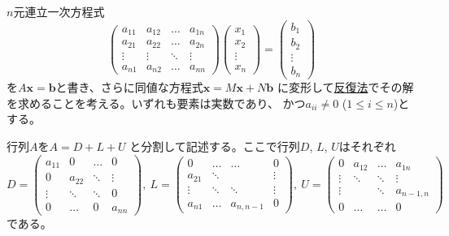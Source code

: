 
$n$元連立一次方程式
\begin{equation*}
  \begin{pmatrix}
    a_{11} & a_{12} & \ldots & a_{1n}\\
    a_{21} & a_{22} & \ldots & a_{2n}\\
    \vdots & \vdots & \ddots & \vdots \\
    a_{n1} & a_{n2} & \ldots & a_{nn}
  \end{pmatrix}
  \begin{pmatrix}
    x_{1} \\
    x_{2} \\
    \vdots\\
    x_{n}
  \end{pmatrix}
  =
  \begin{pmatrix}
    b_{1} \\
    b_{2} \\
    \vdots\\
    b_{n}
  \end{pmatrix}
\end{equation*}
を$A\mathbf{x} = \mathbf{b}$と書き、さらに同値な方程式$\mathbf{x} = M\mathbf{x}+N\mathbf{b}$
に変形して\underline{反復法}でその解を求めることを考える。いずれも要素は実数であり、
かつ$a_{ii}\neq 0$ ($1\le i\le n$)とする。

行列$A$を$A = D + L + U$ と分割して記述する。ここで行列$D$, $L$, $U$はそれぞれ
\begin{equation*}
  D = \begin{pmatrix}
        a_{11} &  0      & \ldots & 0\\
        0      & a_{22}  & \ddots & \vdots\\
        \vdots & \ddots  & \ddots & 0\\
        0      &  \ldots & 0      & a_{nn}
      \end{pmatrix},\ 
  L = \begin{pmatrix}
        0      & \ldots & \ldots & 0 \\
        a_{21} & \ddots &        & \vdots\\
        \vdots & \ddots & \ddots & \vdots \\
        a_{n1} & \ldots & a_{n,n-1} & 0
      \end{pmatrix},\ 
  U = \begin{pmatrix}
        0      & a_{12} & \ldots & a_{1n} \\
        \vdots & \ddots & \ddots & \vdots\\
        \vdots &        & \ddots & a_{n-1,n} \\
        0      & \ldots & \ldots & 0
      \end{pmatrix}
    \end{equation*}
である。

